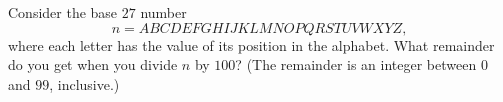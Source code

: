 Consider the base $27$ number
\[
	n=ABCDEFGHIJKLMNOPQRSTUVWXYZ,
\]
where each letter has the value of its position in the alphabet. What remainder do you get when you divide $n$ by $100$? (The remainder is an integer between $0$ and $99$, inclusive.)